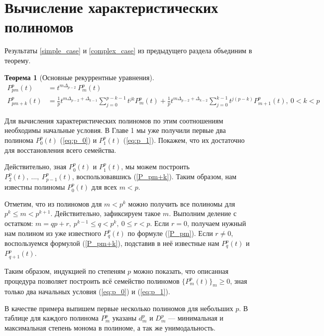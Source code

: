 \documentclass[14pt, a4paper, russian]{report}
\newtheorem{theorem}{\indent Теорема}
\begin{document}
\section{Вычисление характеристических полиномов}
Результаты \cref{simple_case} и \cref{complex_case} из предыдущего раздела объединим в теорему.
\begin{theorem}[Основные рекуррентные уравнения] 
\begin{align}
\label{P_pm} P_{pm}^p(t) & =  t^{m\Delta_{p-2}}\ P_m^p(t) \\
\label{P_pm+k} P_{pm+k}^p(t) & =  \frac{1}{p} t^{m\Delta_{p-2} + \Delta_{k-1}}\sum\limits_{j=0}^{p-k-1} t^{jk} P_m^p(t)  + \frac{1}{p} t^{m\Delta_{p-2} + \Delta_{k-2}}\sum\limits_{j=0}^{k-1} t^{j(p-k)} P_{m+1}^p(t), \ 0 < k < p
\end{align}
\end{theorem}
Для вычисления характеристических полиномов по этим соотношениям необходимы начальные условия. В Главе 1 мы уже получили первые два полинома $P_0^p(t)$ (\ref{eq:p_0}) и $P_1^p(t)$ (\ref{eq:p_1}). Покажем, что их достаточно для восстановления всего семейства. 

Действительно, зная $P_0^p(t)$ и $P_1^p(t)$, мы можем построить $P_2^p(t),\ \ldots
 ,\  P_{p-1}^p(t)$, воспользовавшись (\ref{P_pm+k}). Таким образом, нам известны полиномы $P_0^p(t)$ для всех $m < p$.
 
Отметим, что из полиномов для $m<p^k$ можно получить все полиномы для $p^k \le m < p^{k+1}$. Действительно, зафиксируем такое $m$. Выполним деление с остатком: $m = qp + r, \ p^{k-1} \le q < p^k,\ 0 \le r < p$. Если $r=0$, получаем нужный нам полином из уже известного $P_q^p(t)$ по формуле (\ref{P_pm}). Если $r \ne 0$, воспользуемся формулой (\ref{P_pm+k}), подставив в неё известные нам $P_q^p(t)$ и $P_{q+1}^p(t)$.

Таким образом, индукцией по степеням $p$ можно показать, что описанная процедура позволяет построить всё семейство полиномов $\{P_m^p(t)\}_m \ge 0$, зная только два начальных условия (\ref{eq:p_0}) и  (\ref{eq:p_1}).

В качестве примера выпишем первые несколько полиномов для небольших $p$. В таблице для каждого полинома $P_m^p$ указаны $d_m^p$ и $D_m^p$ --- минимальная и максимальная степень монома в полиноме, а так же унимодальность. 
\end{document}
